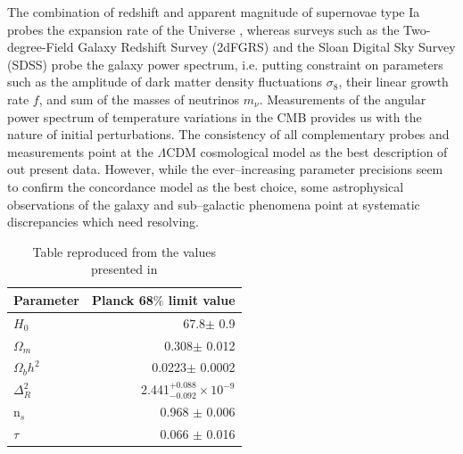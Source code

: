 \documentclass[paper=a4, fontsize=11pt]{scrartcl} %
\numberwithin{equation}{section} %
\numberwithin{figure}{section} %
\numberwithin{table}{section} %
\newcommand{\ignore}[1]{}
\begin{document}
The combination of redshift and apparent magnitude of supernovae type Ia probes the expansion rate of the Universe \citep[][]{SNeIa}, whereas surveys such as the Two-degree-Field Galaxy Redshift Survey (2dFGRS) \citep[][]{2dFGRS} and the Sloan Digital Sky Survey (SDSS) \citep[][]{SDSS} probe the galaxy power spectrum\ignore{ leading to the development of a theory of structure formation}, i.e. putting constraint on parameters such as the amplitude of dark matter density fluctuations $\sigma_8$, their linear growth rate $f$, and sum of the masses of neutrinos $m_\nu$. Measurements of the angular power spectrum of temperature variations in the CMB \citep[COBE, WMAP, Planck][]{} provides us with the nature of initial perturbations. The consistency of all complementary probes and measurements point at the $\Lambda$CDM cosmological model as the best description of out present data. However, while the ever--increasing parameter precisions seem to confirm the concordance model as the best choice, some astrophysical observations of the galaxy and sub--galactic phenomena point at systematic discrepancies which need resolving.

\begin{table}
\begin{tabular}{l{}r}
\label{tab:LCDM_Planck15}
Parameter              & Planck 68$\%$ limit value \\
\hline
$H_0$ & 67.8$\pm$ 0.9 \\
$\Omega_m$ & 0.308$\pm$ 0.012 \\
$\Omega_b h^2$ & 0.0223$\pm$ 0.0002 \\
$\Delta^2_R$ & 2.441$^{+0.088}_{-0.092} \times 10^{-9}$ \\
n$_s$ & 0.968 $\pm$ 0.006\\
$\tau$ & 0.066 $\pm$ 0.016\\
\end{tabular}
\caption[Table caption text]{Table reproduced from the values presented in \citet[][]{Planck2015}}
\end{table}


\end{document}

